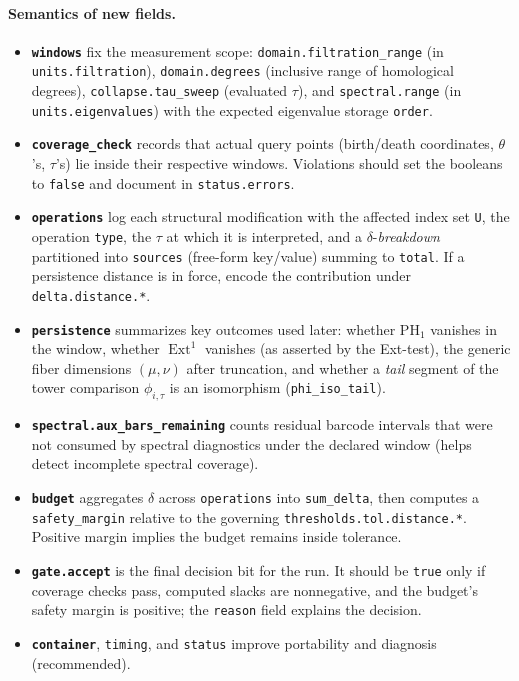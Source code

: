 \documentclass[11pt]{article}
\DeclareMathOperator{\Ext}{Ext}
\numberwithin{equation}{section}
\theoremstyle{definition}
\begin{document}
\paragraph{Semantics of new fields.}
\begin{itemize}
\item \textbf{\texttt{windows}} fix the measurement scope: \texttt{domain.filtration\_range} (in \texttt{units.filtration}),
      \texttt{domain.degrees} (inclusive range of homological degrees), \texttt{collapse.tau\_sweep} (evaluated \(\tau\)),
      and \texttt{spectral.range} (in \texttt{units.eigenvalues}) with the expected eigenvalue storage \texttt{order}.
\item \textbf{\texttt{coverage\_check}} records that actual query points (birth/death coordinates, \(\theta\)'s, \(\tau\)'s)
      lie inside their respective windows. Violations should set the booleans to \texttt{false} and document in \texttt{status.errors}.
\item \textbf{\texttt{operations}} log each structural modification with the affected index set \texttt{U}, the operation \texttt{type},
      the \(\tau\) at which it is interpreted, and a \(\delta\)-\emph{breakdown} partitioned into \texttt{sources} (free-form key/value)
      summing to \texttt{total}. If a persistence distance is in force, encode the contribution under \texttt{delta.distance.*}.
\item \textbf{\texttt{persistence}} summarizes key outcomes used later: whether \( \mathrm{PH}_1 \) vanishes in the window,
      whether \( \Ext^1 \) vanishes (as asserted by the Ext-test), the generic fiber dimensions \((\mu,\nu)\) after truncation,
      and whether a \emph{tail} segment of the tower comparison \(\phi_{i,\tau}\) is an isomorphism (\texttt{phi\_iso\_tail}).
\item \textbf{\texttt{spectral.aux\_bars\_remaining}} counts residual barcode intervals that were not consumed by spectral
      diagnostics under the declared window (helps detect incomplete spectral coverage).
\item \textbf{\texttt{budget}} aggregates \(\delta\) across \texttt{operations} into \texttt{sum\_delta}, then computes a
      \texttt{safety\_margin} relative to the governing \texttt{thresholds.tol.distance.*}. Positive margin implies
      the budget remains inside tolerance.
\item \textbf{\texttt{gate.accept}} is the final decision bit for the run. It should be \texttt{true} only if coverage checks pass,
      computed slacks are nonnegative, and the budget’s safety margin is positive; the \texttt{reason} field explains the decision.
\item \textbf{\texttt{container}}, \texttt{timing}, and \texttt{status} improve portability and diagnosis (recommended).
\end{itemize}
\end{document}
